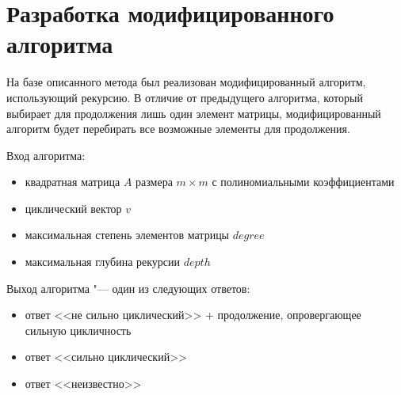 \section{Разработка модифицированного алгоритма}

На базе описанного метода был реализован модифицированный алгоритм, использующий рекурсию.
В отличие от предыдущего алгоритма, который выбирает для продолжения лишь один элемент матрицы,
модифицированный алгоритм будет перебирать все возможные элементы для продолжения.

Вход алгоритма:
\begin{itemize}
    \item
        квадратная матрица $A$ размера $m \times m$ с полиномиальными коэффициентами
    \item
        циклический вектор $v$
    \item
        максимальная степень элементов матрицы $degree$
    \item
        максимальная глубина рекурсии $depth$
\end{itemize}

Выход алгоритма "--- один из следующих ответов:
\begin{itemize}
    \item
        ответ <<не сильно циклический>> + продолжение, опровергающее сильную цикличность
    \item
        ответ <<сильно циклический>>
    \item
        ответ <<неизвестно>>
\end{itemize}


